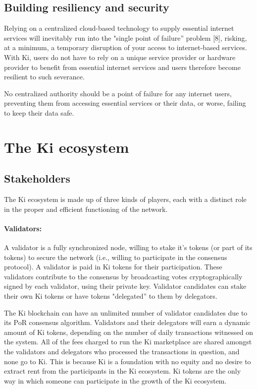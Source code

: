 \subsection{Building resiliency and security}
\label{sec:kidevicesecurity}
Relying on a centralized cloud-based technology to supply essential internet services will inevitably run into the "single point of failure'' problem [8], risking, at a minimum, a temporary disruption of your access to internet-based services. With Ki, users do not have to rely on a unique service provider or hardware provider to benefit from essential internet services and users therefore become resilient to such severance.

No centralized authority should be a point of failure for any internet users, preventing them from accessing essential services or their data, or worse, failing to keep their data safe.


\section{The Ki ecosystem }
\label{sec:kiecosystem}


\subsection{Stakeholders}
\label{sec:kiecosystemstakeholder}
The Ki ecosystem is made up of three kinds of players, each with a distinct role in the proper and efficient functioning of the network.
					
\paragraph{Validators:} A validator is a fully synchronized node, willing to stake it's tokens (or part of its tokens) to secure the network (i.e., willing to participate in the consensus protocol). A validator is paid in Ki tokens for their participation. These validators contribute to the consensus by broadcasting votes cryptographically signed by each validator, using their private key. Validator candidates can stake their own Ki tokens or have tokens "delegated'' to them by delegators. 
			
					
The Ki blockchain can have an unlimited number of validator candidates due to its PoR consensus algorithm. Validators and their delegators will earn a dynamic amount of Ki tokens, depending on the number of daily transactions witnessed on the system. All of the fees charged to run the Ki marketplace are shared amongst the validators and delegators who processed the transactions in question, and none go to Ki. This is because Ki is a foundation with no equity and no desire to extract rent from the participants in the Ki ecosystem. Ki tokens are the only way in which someone can participate in the growth of the Ki ecosystem. 

